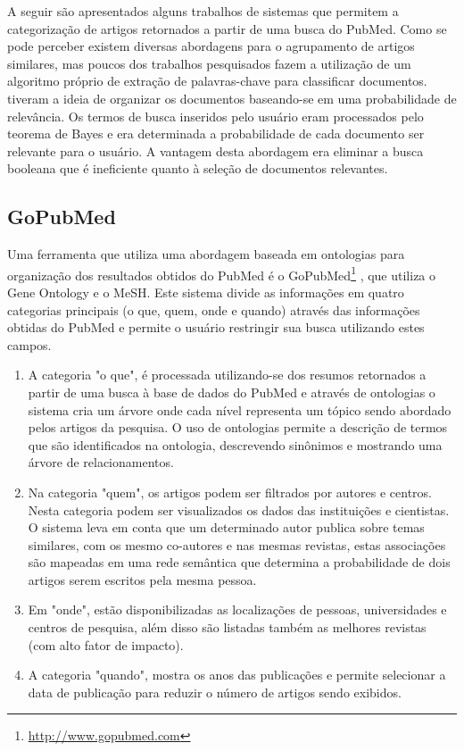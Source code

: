 A seguir são apresentados alguns trabalhos de sistemas que permitem a categorização de artigos retornados a partir de uma busca do PubMed. Como se pode perceber existem diversas abordagens para o agrupamento de artigos similares, mas poucos dos trabalhos pesquisados fazem a utilização de um algoritmo próprio de extração de palavras-chave para classificar documentos. \cite{Maron1958} tiveram a ideia de organizar os documentos baseando-se em uma probabilidade de relevância. Os termos de busca inseridos pelo usuário eram processados pelo teorema de Bayes e era determinada a probabilidade de cada documento ser relevante para o usuário. A vantagem desta abordagem era eliminar a busca booleana que é ineficiente quanto à seleção de documentos relevantes.

\subsection{GoPubMed}

Uma ferramenta que utiliza uma abordagem baseada em ontologias para organização dos resultados obtidos do PubMed é o GoPubMed\footnote{\href{http://www.gopubmed.com}{http://www.gopubmed.com}} \cite{Doms2005}, que utiliza o Gene Ontology e o MeSH. Este sistema divide as informações em quatro categorias principais (o que, quem, onde e quando) através das informações obtidas do PubMed e  permite o usuário restringir sua busca utilizando estes campos.

\begin{enumerate}
\item A categoria "o que", é processada utilizando-se dos resumos retornados a partir de uma busca à base de dados do PubMed e através de ontologias o sistema cria um árvore onde cada nível representa um tópico sendo abordado pelos artigos da pesquisa. O uso de ontologias permite a descrição de termos que são identificados na ontologia, descrevendo sinônimos e mostrando uma árvore de relacionamentos.

\item Na categoria "quem", os artigos podem ser filtrados por autores e centros. Nesta categoria podem ser visualizados os dados das instituições e cientistas. O sistema leva em conta que um determinado autor publica sobre temas similares, com os mesmo co-autores e nas mesmas revistas, estas associações são mapeadas em uma rede semântica que determina a probabilidade de dois artigos serem escritos pela mesma pessoa.

\item Em "onde", estão disponibilizadas as localizações de pessoas, universidades e centros de pesquisa, além disso são listadas também as melhores revistas (com alto fator de impacto).

\item A categoria "quando", mostra os anos das publicações e permite selecionar a data de publicação para reduzir o número de artigos sendo exibidos.
\end{enumerate}

